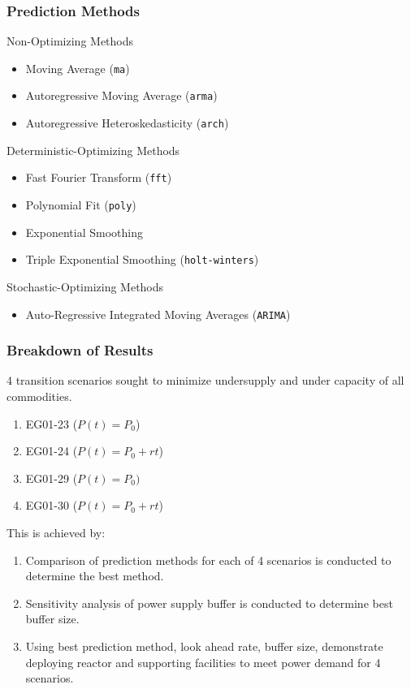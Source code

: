 \begin{frame}
\frametitle{\deploy Prediction Methods}
Non-Optimizing Methods 
\begin{itemize}
\item Moving Average (\texttt{ma})
\item Autoregressive Moving Average (\texttt{arma})
\item Autoregressive Heteroskedasticity (\texttt{arch})
\end{itemize}
Deterministic-Optimizing Methods 
\begin{itemize}
\item Fast Fourier Transform (\texttt{fft})
\item Polynomial Fit (\texttt{poly})
\item Exponential Smoothing
\item Triple Exponential Smoothing (\texttt{holt-winters})
\end{itemize}
Stochastic-Optimizing Methods 
\begin{itemize}
\item Auto-Regressive Integrated Moving Averages (\texttt{ARIMA})
\end{itemize}
\end{frame}

\begin{frame}
\frametitle{Breakdown of Results}
4 transition scenarios sought to minimize undersupply and under capacity of 
all commodities.
\begin{enumerate}
	\item EG01-23 ($P(t) = P_0$)
	\item EG01-24 ($P(t) = P_0 + rt$)
	\item EG01-29 ($P(t) = P_0)$
	\item EG01-30 ($P(t) = P_0 + rt$)
\end{enumerate}

This is achieved by:
\begin{enumerate}
	\item Comparison of prediction methods for each of 4 scenarios is conducted 
	to determine the best method. 
	\item Sensitivity analysis of power supply buffer is conducted to determine 
	best buffer size. 
	\item Using best prediction method, look ahead rate, buffer size, demonstrate \deploy 
	deploying reactor and supporting facilities to meet power demand 
	for 4 scenarios. 
\end{enumerate}

\end{frame}

